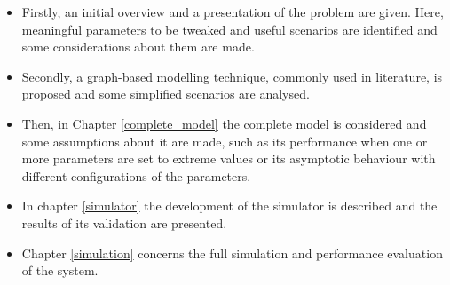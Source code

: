 \begin{itemize}
    \item Firstly, an initial overview and a presentation of the problem are
    given. Here, meaningful parameters to be tweaked and useful scenarios are
    identified and some considerations about them are made.
    \item Secondly, a graph-based modelling technique, commonly used in
    literature, is proposed and some simplified scenarios are analysed.
    \item Then, in Chapter \ref{complete_model} the complete model is considered
    and some assumptions about it are made, such as its performance when one or
    more parameters are set to extreme values or its asymptotic behaviour with
    different configurations of the parameters.
    \item In chapter \ref{simulator} the development of the simulator is
    described and the results of its validation are presented.
    \item Chapter \ref{simulation} concerns the full simulation and performance
    evaluation of the system.
\end{itemize}
